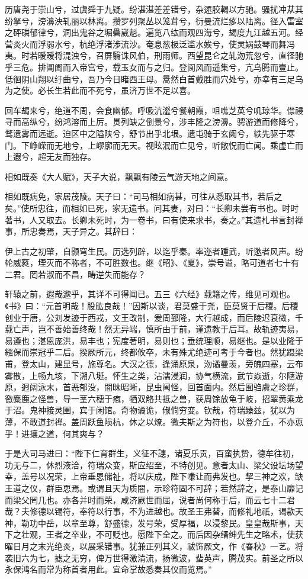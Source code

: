 \documentclass[]{article}
\begin{document}
历唐尧于崇山兮，过虞舜于九疑。纷湛湛差差错兮，杂遝胶輵以方驰。骚扰冲苁其纷拏兮，滂濞泱轧丽以林离。攒罗列聚丛以笼茸兮，衍曼流烂痑以陆离。径入雷室之砰磷郁律兮，洞出鬼谷之堀礨崴魁。遍览八纮而观四海兮，朅度九江越五河。经营炎火而浮弱水兮，杭绝浮渚涉流沙。奄息葱极泛滥水娭兮，使灵娲鼓琴而舞冯夷。时若暧暧将混浊兮，召屏翳诛风伯，刑雨师。西望昆仑之轧沕荒忽兮，直径驰乎三危。排阊阖而入帝宫兮，载玉女而与之归。登阆风而遥集兮，亢鸟腾而壹止。低徊阴山翔以纡曲兮，吾乃今日睹西王母。暠然白首戴胜而穴处兮，亦幸有三足乌为之使。必长生若此而不死兮，虽济万世不足以喜。

回车朅来兮，绝道不周，会食幽郁。呼吸沆瀣兮餐朝霞，咀噍芝英兮叽琼华。僸祲寻而高纵兮，纷鸿溶而上厉。贯列缺之倒景兮，涉丰隆之滂濞。骋游道而修降兮，骛遗雾而远逝。迫区中之隘陕兮，舒节出乎北垠。遗屯骑于玄阙兮，轶先驱于寒门。下峥嵘而无地兮，上嵺廓而无天。视眩泯而亡见兮，听敞怳而亡闻。乘虚亡而上遐兮，超无友而独存。

相如既奏《大人赋》，天子大说，飘飘有陵云气游天地之间意。

相如既病免，家居茂陵。天子曰：``司马相如病甚，可往从悉取其书，若后之矣。''使所忠往，而相如已死，家无遗书。问其妻，对曰：``长卿未尝有书也。时时著书，人又取去。长卿未死时，为一卷书，曰有使来求书，奏之。''其遗札书言封禅事，所忠奏焉，天子异之。其辞曰：

伊上古之初肇，自颢穹生民。历选列辟，以迄乎秦。率迩者踵武，听逖者风声。纷轮威蕤，堙灭而不称者，不可胜数也。继《昭》、《夏》，崇号谥，略可道者七十有二君。罔若淑而不昌，畴逆失而能存？

轩辕之前，遐哉邈乎，其详不可得闻已。五三《六经》载籍之传，维见可观也。《书》曰：``元首明哉！股肱良哉！''因斯以谈，君莫盛于尧，臣莫贤于后稷。后稷创业于唐，公刘发迹于西戎，文王改制，爰周郅隆，大行越成，而后陵迟衰微，千载亡声，岂不善始善终哉！然无异端，慎所由于前，谨遗教于后耳。故轨迹夷易，易遵也；湛恩庞洪，易丰也；宪度著明，易则也；垂统理顺，易继也。是以业隆于繦保而崇冠乎二后。揆厥所元，终都攸卒，未有殊尤绝迹可考于今者也。然犹蹑梁甫，登太山，建显号，施尊名。大汉之德，逢涌原泉，沕谲曼羡，旁魄四塞，云布雾散，上畅九垓，下溯八埏。怀生之类，沾濡浸润，协气横流，武节焱逝，尔陿游原，迥阔泳末，首恶郁没，闇昧昭晰，昆虫闿怪，回首面内。然后囿驺虞之珍群，徼麋鹿之怪兽，导一茎六穗于疱，牺双觡共抵之兽，获周馀放龟于岐，招翠黄乘龙于沼。鬼神接灵圉，宾于闲馆。奇物谲诡，俶倘穷变。钦哉，符瑞臻兹，犹以为薄，不敢道封禅。盖周跃鱼陨杭，休之以燎。微夫斯之为符也，以登介丘，不亦恧乎！进攘之道，何其爽与？

于是大司马进曰：``陛下仁育群生，义征不譓，诸夏乐贡，百蛮执贽，德牟往初，功无与二，休烈液洽，符瑞众变，斯应绍至，不特创见。意者太山、梁父设坛场望幸，盖号以况荣，上帝垂恩储祉，将以庆成，陛下嗛让而弗发也。挈三神之欢，缺王道之仪，群臣恧焉。或谓且天为质闇，示珍符固不可辞；若然辞之，是泰山靡记而梁父罔几也。亦各并时而荣，咸济厥世而屈，说者尚何称于后，而云七十二君哉？夫修德以锡符，奉符以行事，不为进越也。故圣王弗替，而修礼地祇，谒款天神，勒功中岳，以章至尊，舒盛德，发号荣，受厚福，以浸黎民。皇皇哉斯事，天下之壮观，王者之卒业，不可贬也。愿陛下全之。而后因杂缙绅先生之略术，使获曜日月之末光绝炎，以展采错事。犹兼正列其义，祓饰厥文，作《春秋》一艺。将袭旧六为七，摅之无穷，俾万世得激清流，扬微波，蜚英声，腾茂实。前圣之所以永保鸿名而常为称首者用此。宜命掌故悉奏其仪而览焉。''
\end{document}
